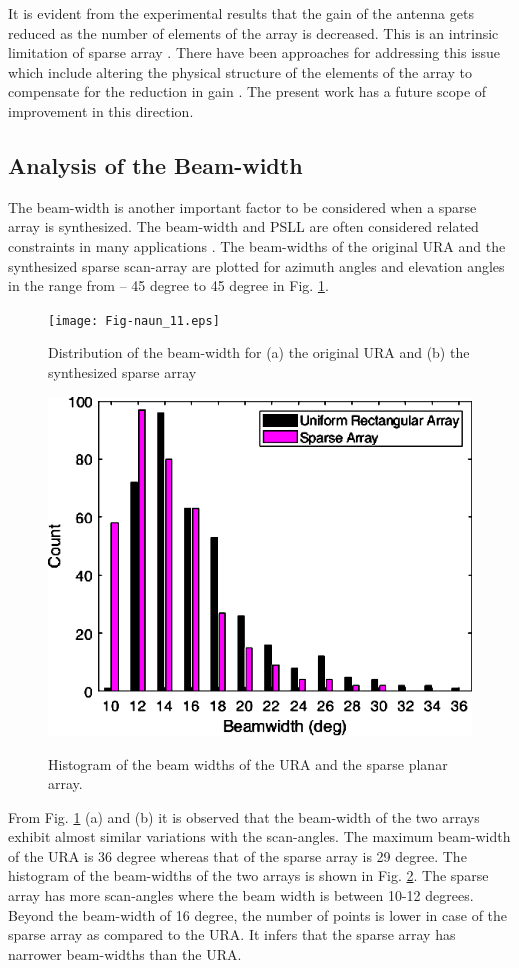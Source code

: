 It is evident from the experimental results that the gain of the antenna gets reduced as the number of elements of the array is decreased. This is an intrinsic limitation of sparse array \cite{sparse_rect_planar}. There have been approaches for addressing this issue which include altering the physical structure of the elements of the array to compensate for the reduction in gain \cite{compact_sparse_array_satcom}. The present work has a future scope of improvement in this direction.

\subsection{Analysis of the Beam-width}
The beam-width is another important factor to be considered when a sparse array is synthesized. The beam-width and PSLL are often considered related constraints in many applications \cite{arrayTradeoffs}. The beam-widths of the original URA and the synthesized sparse scan-array are plotted for azimuth angles and elevation angles in the range from -- 45 degree to 45 degree in Fig. \ref{fig_5_11}.

\begin{figure}
  \centering
  \texttt{[image: Fig-naun\_11.eps]}\\
  \caption{Distribution of the beam-width for (a) the original URA and (b) the synthesized sparse array} \label{fig_5_11}
\end{figure}

\begin{figure}
  \centering
  \includegraphics[width=0.5\linewidth]{Fig-naun_12.eps}\\
  \caption{Histogram of the beam widths of the URA and the sparse planar array.} \label{fig_5_12}
\end{figure}

From Fig. \ref{fig_5_11} (a) and (b) it is observed that the beam-width of the two arrays exhibit almost similar variations with the scan-angles. The maximum beam-width of the URA is 36 degree whereas that of the sparse array is 29 degree. The histogram of the beam-widths of the two arrays is shown in Fig. \ref{fig_5_12}. The sparse array has more scan-angles where the beam width is between 10-12 degrees. Beyond the beam-width of 16 degree, the number of points is lower in case of the sparse array as compared to the URA. It infers that the sparse array has narrower beam-widths than the URA.

